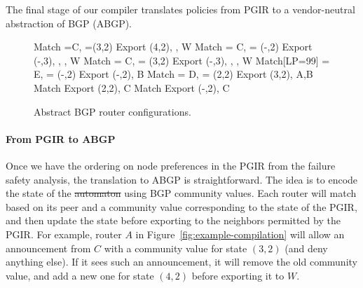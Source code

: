 \documentclass{sig-alternate-10pt}
\newcommand{\para}[1]{\paragraph*{\textbf{#1}}}
\providecommand{\DIFadd}[1]{{\protect\color{blue}\uwave{#1}}} %
\providecommand{\DIFdel}[1]{{\protect\color{red}\sout{#1}}}                      %
\providecommand{\DIFaddbegin}{} %
\providecommand{\DIFaddend}{} %
\providecommand{\DIFdelbegin}{} %
\providecommand{\DIFdelend}{} %
\begin{document}

The final stage of our compiler translates policies from PGIR to a vendor-neutral abstraction of BGP (ABGP).

\DIFaddbegin \begin{figure}[t!]
\begin{code}
    Match \PEER=C, \COMM=(3,2)
      Export \COMM \Arrow (4,2), \MED {}, \PEER \Arrow W
    Match \PEER = C, \COMM = (-,2)
      Export \COMM \Arrow (-,3), \COMM \Arrow {},
             \MED {}, \PEER \Arrow W
    Match \PEER = C, \COMM = (3,2)
      Export \COMM \Arrow (-,3), \COMM \Arrow {},
             \MED {}, \PEER \Arrow W
    Match[LP=99] \PEER = E, \COMM = (-,2) 
      Export \COMM \Arrow (-,2), \PEER \Arrow B
    Match \PEER = D, \COMM = (2,2)
      Export \COMM \Arrow (3,2), \PEER \Arrow A,B
    Match 
      Export \COMM \Arrow (2,2), \PEER \Arrow C
    Match 
      Export \COMM \Arrow (-,2), \PEER \Arrow C
  \end{code}
  \vspace{-2em} 
  \caption{Abstract BGP router configurations. \label{fig:abgp-config}}
  \vspace{-1em}
\end{figure}

\DIFaddend \para{From PGIR to ABGP}

Once we have the ordering on node preferences in the PGIR from the failure safety analysis, the translation to ABGP is straightforward. The idea is to encode the state of the \DIFdelbegin \DIFdel{automaton }\DIFdelend \DIFaddbegin \DIFadd{automata }\DIFaddend using BGP community values. Each router will match based on its peer and a community value corresponding to the state of the PGIR, and then update the state before exporting to the neighbors permitted by the PGIR. For example, router $A$ in Figure~\ref{fig:example-compilation} will allow an announcement from $C$ with a community value for state $(3,2)$ (and deny anything else). If it sees such an announcement, it will remove the old community value, and add a new one for state $(4,2)$ before exporting it to $W$.
\end{document}
